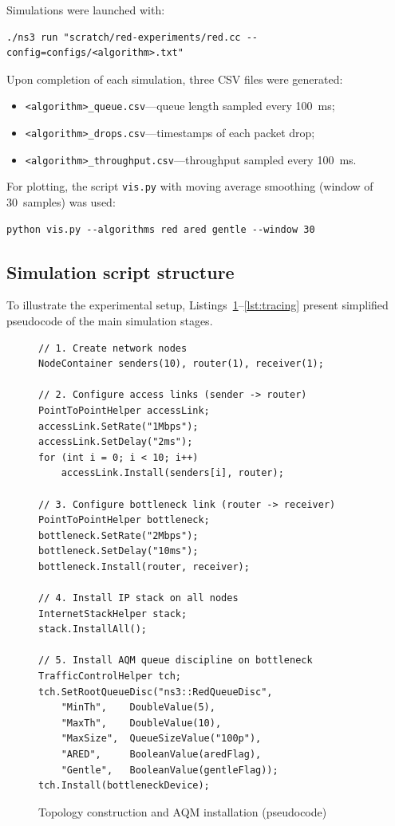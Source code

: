 \documentclass[default]{subfiles}
\begin{document}
{Simulations were launched with:
\begin{verbatim}
./ns3 run "scratch/red-experiments/red.cc --config=configs/<algorithm>.txt"
\end{verbatim}

Upon completion of each simulation, three CSV files were generated:
\begin{itemize}
  \item \texttt{<algorithm>\_queue.csv}---queue length sampled every 100~ms;
  \item \texttt{<algorithm>\_drops.csv}---timestamps of each packet drop;
  \item \texttt{<algorithm>\_throughput.csv}---throughput sampled every 100~ms.
\end{itemize}

For plotting, the script \texttt{vis.py} with moving average smoothing (window of 30~samples) was used:
\begin{verbatim}
python vis.py --algorithms red ared gentle --window 30
\end{verbatim}

\subsection{Simulation script structure}

To illustrate the experimental setup, Listings~\ref{lst:topology}--\ref{lst:tracing} present simplified pseudocode of the main simulation stages.

\begin{figure}[H]
\begin{verbatim}
// 1. Create network nodes
NodeContainer senders(10), router(1), receiver(1);

// 2. Configure access links (sender -> router)
PointToPointHelper accessLink;
accessLink.SetRate("1Mbps");
accessLink.SetDelay("2ms");
for (int i = 0; i < 10; i++)
    accessLink.Install(senders[i], router);

// 3. Configure bottleneck link (router -> receiver)
PointToPointHelper bottleneck;
bottleneck.SetRate("2Mbps");
bottleneck.SetDelay("10ms");
bottleneck.Install(router, receiver);

// 4. Install IP stack on all nodes
InternetStackHelper stack;
stack.InstallAll();

// 5. Install AQM queue discipline on bottleneck
TrafficControlHelper tch;
tch.SetRootQueueDisc("ns3::RedQueueDisc",
    "MinTh",    DoubleValue(5),
    "MaxTh",    DoubleValue(10),
    "MaxSize",  QueueSizeValue("100p"),
    "ARED",     BooleanValue(aredFlag),
    "Gentle",   BooleanValue(gentleFlag));
tch.Install(bottleneckDevice);
\end{verbatim}
\caption{Topology construction and AQM installation (pseudocode)}
\label{lst:topology}
\end{figure}

}
\end{document}
